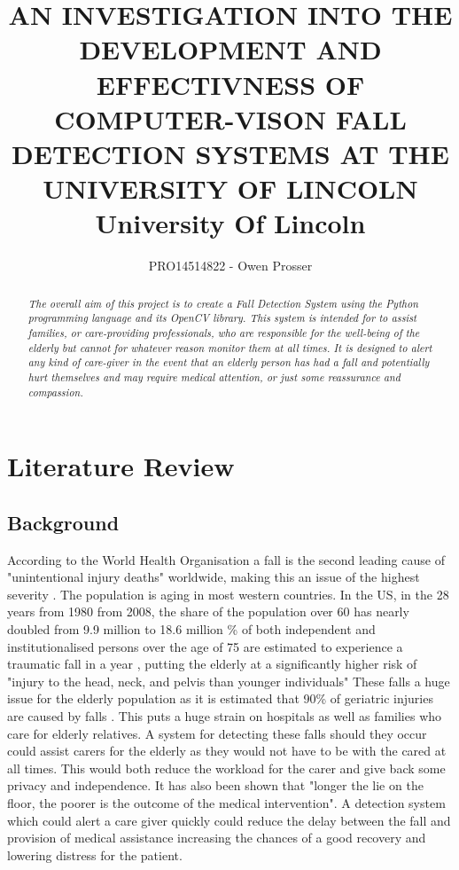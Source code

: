 \documentclass[11pt,a4paper]{report}
\title{
	{AN INVESTIGATION INTO THE DEVELOPMENT AND EFFECTIVNESS OF COMPUTER-VISON FALL DETECTION SYSTEMS AT THE UNIVERSITY OF LINCOLN}\\
	{\large University Of Lincoln}
}
\author{PRO14514822 - Owen Prosser}
\newcommand\blankpage{%
    \null
    \thispagestyle{empty}%
    \addtocounter{page}{-1}%
    \newpage}
\begin{document}
\maketitle

\begin{abstract}
\emph{The overall aim of this project is to create a Fall Detection System using the Python programming language and its OpenCV library. This system is intended for to assist families, or care-providing professionals, who are responsible for the well-being of the elderly but cannot for whatever reason monitor them at all times. It is designed to alert any kind of care-giver in the event that an elderly person has had a fall and potentially hurt themselves and may require medical attention, or just some reassurance and compassion.}
\end{abstract}


\tableofcontents


\chapter{Literature Review} %
\section{Background}
According to the World Health Organisation a fall is the second leading cause of "unintentional injury deaths" worldwide, making this an issue of the highest severity \citep{Cruz_Fall_detection_wearable_device}. The population is aging in most western countries. In the US, in the 28 years from 1980 from 2008, the share of the population over 60 has nearly doubled from 9.9 million to 18.6 million \citep{Siracuse_Health_care_and_socioeconomic}\% of both independent and institutionalised persons over the age of 75 are estimated to experience a traumatic fall in a year \citep{Sixsmith_A_smart_sensor_to_detect}, putting the elderly at a significantly higher risk of "injury to the head, neck, and pelvis than younger individuals"  These falls a huge issue for the elderly population as it is estimated that 90\% of geriatric injuries are caused by falls \citep{boltz_Injuries_and_outcomes}. This puts a huge strain on hospitals as well as families who care for elderly relatives. A system for detecting these falls should they occur could assist carers for the elderly as they would not have to be with the cared at all times. This would both reduce the workload for the carer and give back some privacy and independence. It has also been shown that "longer the lie on the floor, the poorer is the outcome of the medical intervention"\citep{Li_A_microphone_array}. A detection system which could alert a care giver quickly could reduce the delay between the fall and provision of medical assistance increasing the chances of a good recovery and lowering distress for the patient.
\end{document}

